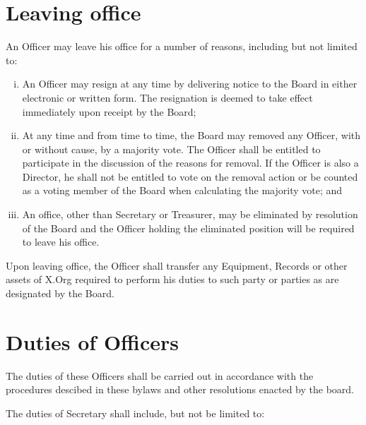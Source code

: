 \documentclass[10pt, english]{xorgdocs}
\begin{document}
\section{Leaving office}
An Officer may leave his office for a number of reasons, including but not
limited to:

\begin{enumerate}[(i)\hspace{.2cm}]
	\item An Officer may resign at any time by delivering notice to the
	Board in either electronic or written form.  The resignation is deemed
	to take effect immediately upon receipt by the Board;

	\item At any time and from time to time, the Board may removed any
	Officer, with or without cause, by a majority vote.  The Officer shall
	be entitled to participate in the discussion of the reasons for removal.
	If the Officer is also a Director, he shall not be entitled to vote on
	the removal action or be counted as a voting member of the Board when
	calculating the majority vote; and

	\item An office, other than Secretary or Treasurer, may be eliminated by
	resolution of the Board and the Officer holding the eliminated position
	will be required to leave his office.

\end{enumerate}

Upon leaving office, the Officer shall transfer any Equipment, Records or other
assets of X.Org required to perform his duties to such party or parties as are
designated by the Board.

\section{Duties of Officers}
The duties of these Officers shall be carried out in accordance with the
procedures descibed in these bylaws and other resolutions enacted by the board.

The duties of Secretary shall include, but not be limited to:
\end{document}
